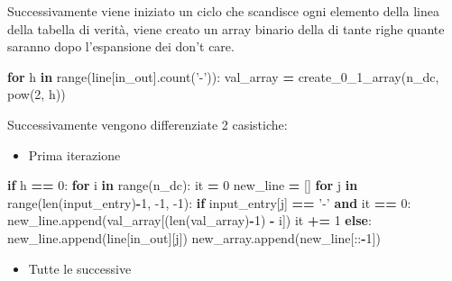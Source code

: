 \documentclass[]{book}
\newenvironment{Shaded}{\begin{snugshade}}{\end{snugshade}}
\newcommand{\BuiltInTok}[1]{#1}
\newcommand{\ControlFlowTok}[1]{\textcolor[rgb]{0.13,0.29,0.53}{\textbf{#1}}}
\newcommand{\DecValTok}[1]{\textcolor[rgb]{0.00,0.00,0.81}{#1}}
\newcommand{\KeywordTok}[1]{\textcolor[rgb]{0.13,0.29,0.53}{\textbf{#1}}}
\newcommand{\NormalTok}[1]{#1}
\newcommand{\OperatorTok}[1]{\textcolor[rgb]{0.81,0.36,0.00}{\textbf{#1}}}
\newcommand{\StringTok}[1]{\textcolor[rgb]{0.31,0.60,0.02}{#1}}
\providecommand{\tightlist}{%
  \setlength{\itemsep}{0pt}\setlength{\parskip}{0pt}}
\begin{document}
\newpage

Successivamente viene iniziato un ciclo che scandisce ogni elemento della linea della tabella di verità, viene creato un array binario della di tante righe quante saranno dopo l'espansione dei don't care.

\begin{Shaded}
\begin{Highlighting}[]
\ControlFlowTok{for}\NormalTok{ h }\KeywordTok{in} \BuiltInTok{range}\NormalTok{(line[in_out].count(}\StringTok{'-'}\NormalTok{)):}
\NormalTok{  val_array }\OperatorTok{=}\NormalTok{ create_0_1_array(n_dc, }\BuiltInTok{pow}\NormalTok{(}\DecValTok{2}\NormalTok{, h))}
\end{Highlighting}
\end{Shaded}

Successivamente vengono differenziate 2 casistiche:

\begin{itemize}
\tightlist
\item
  Prima iterazione
\end{itemize}

\begin{Shaded}
\begin{Highlighting}[]
\ControlFlowTok{if}\NormalTok{ h }\OperatorTok{==} \DecValTok{0}\NormalTok{:}
  \ControlFlowTok{for}\NormalTok{ i }\KeywordTok{in} \BuiltInTok{range}\NormalTok{(n_dc):}
\NormalTok{    it }\OperatorTok{=} \DecValTok{0}
\NormalTok{    new_line }\OperatorTok{=}\NormalTok{ []}
    \ControlFlowTok{for}\NormalTok{ j }\KeywordTok{in} \BuiltInTok{range}\NormalTok{(}\BuiltInTok{len}\NormalTok{(input_entry)}\OperatorTok{-}\DecValTok{1}\NormalTok{, }\DecValTok{-1}\NormalTok{, }\DecValTok{-1}\NormalTok{):}
      \ControlFlowTok{if}\NormalTok{ input_entry[j] }\OperatorTok{==} \StringTok{'-'} \KeywordTok{and}\NormalTok{ it }\OperatorTok{==} \DecValTok{0}\NormalTok{:}
\NormalTok{        new_line.append(val_array[(}\BuiltInTok{len}\NormalTok{(val_array)}\OperatorTok{-}\DecValTok{1}\NormalTok{) }\OperatorTok{-}\NormalTok{ i])}
\NormalTok{        it }\OperatorTok{+=} \DecValTok{1}
      \ControlFlowTok{else}\NormalTok{:}
\NormalTok{        new_line.append(line[in_out][j])}
\NormalTok{    new_array.append(new_line[::}\OperatorTok{-}\DecValTok{1}\NormalTok{])}
\end{Highlighting}
\end{Shaded}

\begin{itemize}
\tightlist
\item
  Tutte le successive
\end{itemize}
\end{document}
